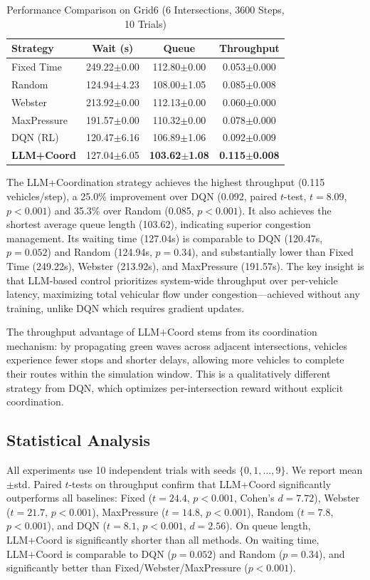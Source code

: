 \documentclass[conference]{IEEEtran}
\begin{document}
\begin{table}[htbp]
\centering
\caption{Performance Comparison on Grid6 (6 Intersections, 3600 Steps, 10 Trials)}
\label{tab:grid6}
\begin{tabular}{lccc}
\toprule
\textbf{Strategy} & \textbf{Wait (s)} & \textbf{Queue} & \textbf{Throughput} \\
\midrule
Fixed Time & 249.22$\pm$0.00 & 112.80$\pm$0.00 & 0.053$\pm$0.000 \\
Random     & 124.94$\pm$4.23 & 108.00$\pm$1.05 & 0.085$\pm$0.008 \\
Webster    & 213.92$\pm$0.00 & 112.13$\pm$0.00 & 0.060$\pm$0.000 \\
MaxPressure & 191.57$\pm$0.00 & 110.32$\pm$0.00 & 0.078$\pm$0.000 \\
DQN (RL)   & 120.47$\pm$6.16 & 106.89$\pm$1.06 & 0.092$\pm$0.009 \\
\textbf{LLM+Coord} & 127.04$\pm$6.05 & \textbf{103.62$\pm$1.08} & \textbf{0.115$\pm$0.008} \\
\bottomrule
\end{tabular}
\end{table}

The LLM+Coordination strategy achieves the highest throughput (0.115 vehicles/step), a 25.0\% improvement over DQN (0.092, paired $t$-test, $t=8.09$, $p<0.001$) and 35.3\% over Random (0.085, $p<0.001$). It also achieves the shortest average queue length (103.62), indicating superior congestion management. Its waiting time (127.04s) is comparable to DQN (120.47s, $p=0.052$) and Random (124.94s, $p=0.34$), and substantially lower than Fixed Time (249.22s), Webster (213.92s), and MaxPressure (191.57s). The key insight is that LLM-based control prioritizes system-wide throughput over per-vehicle latency, maximizing total vehicular flow under congestion---achieved without any training, unlike DQN which requires gradient updates.

The throughput advantage of LLM+Coord stems from its coordination mechanism: by propagating green waves across adjacent intersections, vehicles experience fewer stops and shorter delays, allowing more vehicles to complete their routes within the simulation window. This is a qualitatively different strategy from DQN, which optimizes per-intersection reward without explicit coordination.

\subsection{Statistical Analysis}
All experiments use 10 independent trials with seeds $\{0, 1, \ldots, 9\}$. We report mean$\pm$std. Paired $t$-tests on throughput confirm that LLM+Coord significantly outperforms all baselines: Fixed ($t=24.4$, $p<0.001$, Cohen's $d=7.72$), Webster ($t=21.7$, $p<0.001$), MaxPressure ($t=14.8$, $p<0.001$), Random ($t=7.8$, $p<0.001$), and DQN ($t=8.1$, $p<0.001$, $d=2.56$). On queue length, LLM+Coord is significantly shorter than all methods. On waiting time, LLM+Coord is comparable to DQN ($p=0.052$) and Random ($p=0.34$), and significantly better than Fixed/Webster/MaxPressure ($p<0.001$).
\end{document}
